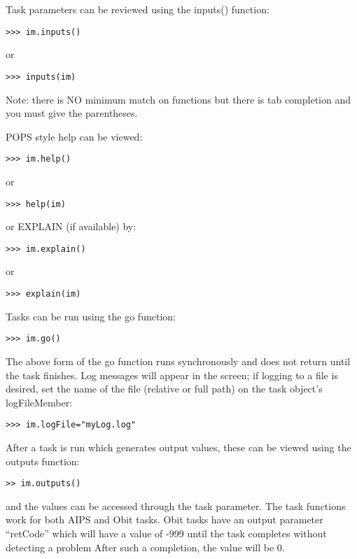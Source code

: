 \documentclass[11pt]{report}
\begin{document}
Task parameters can be reviewed using the inputs() function:
\begin{verbatim}
>>> im.inputs()
\end{verbatim}
or
\begin{verbatim}
>>> inputs(im)
\end{verbatim}
Note: there is NO minimum match on functions but there is tab
completion and you must give the parentheses.  

POPS style help can be viewed:
\begin{verbatim}
>>> im.help()
\end{verbatim}
or
\begin{verbatim}
>>> help(im)
\end{verbatim}
or EXPLAIN (if available) by:
\begin{verbatim}
>>> im.explain()
\end{verbatim}
or
\begin{verbatim}
>>> explain(im)
\end{verbatim}

Tasks can be run using the go function:
\begin{verbatim}
>>> im.go()
\end{verbatim}
The above form of the go function runs synchronously and does not return
until the task finishes. 
Log messages will appear in the screen; if logging to a file is
desired, set the name of the file (relative or full path) on the task
object's logFileMember:
\begin{verbatim}
>>> im.logFile="myLog.log"
\end{verbatim}

After a task is run which generates output values, these can be
viewed using the outputs function:
\begin{verbatim}
>> im.outputs()
\end{verbatim}
and the values can be accessed through the task parameter.
The task functions work for both AIPS and Obit tasks.
Obit tasks have an output parameter ``retCode'' which will have a 
value of -999 until the task completes without detecting a problem
After such a completion, the value will be 0.
\end{document}
